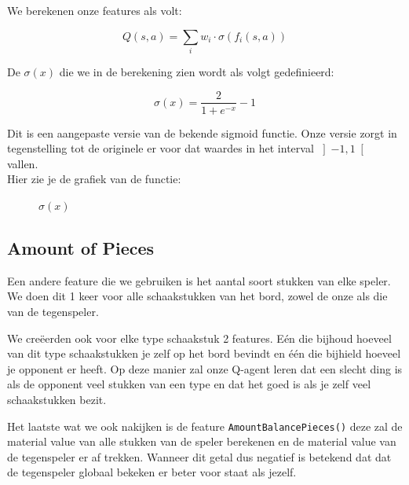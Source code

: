 \documentclass[a4paper,openany]{uantwerpenassignment}
\newcommand{\codeword}[1]{
    \colorbox{code}{\texttt{\textcolor{codetext}{#1}}}
}
\begin{document}
We berekenen onze features als volt:

$$
Q(s,a) = \sum_{i} w_{i} \cdot \sigma \left( f_i(s, a)\right)
$$

De $\sigma(x)$ die we in de berekening zien wordt als volgt gedefinieerd:

$$
\sigma(x) = \frac{2}{1 + e^{-x}} - 1
$$

Dit is een aangepaste versie van de bekende sigmoid\cite{WSF} functie. Onze versie zorgt in tegenstelling tot de originele er voor dat waardes in het interval $\left]-1,1\right[$ vallen.\\
Hier zie je de grafiek van de functie:

\begin{figure}[h]
    \centering
    \caption{$\sigma(x)$} \label{fig:sigmoid}
\end{figure}



\subsection{Amount of Pieces}
Een andere feature die we gebruiken is het aantal soort stukken van elke speler. We doen dit 1 keer voor alle schaakstukken van het bord, zowel de onze als die van de tegenspeler.

We creëerden ook voor elke type schaakstuk 2 features. Eén die bijhoud hoeveel van dit type schaakstukken je zelf op het bord bevindt en één die bijhield hoeveel je opponent er heeft. Op deze manier zal onze Q-agent leren dat een slecht ding is als de opponent veel stukken van een type en dat het goed is als je zelf veel schaakstukken bezit.

Het laatste wat we ook nakijken is de feature \codeword{AmountBalancePieces()} deze zal de material value van alle stukken van de speler berekenen en de material value van de tegenspeler er af trekken. Wanneer dit getal dus negatief is betekend dat dat de tegenspeler globaal bekeken er beter voor staat als jezelf.
\end{document}

